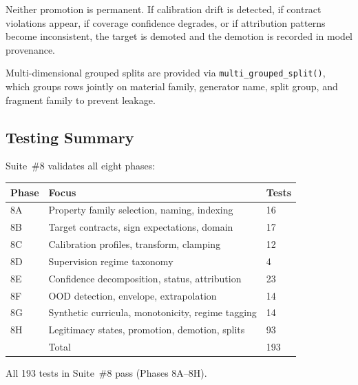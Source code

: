 \documentclass[11pt]{article}
\newcommand{\op}[1]{\texttt{#1}}
\begin{document}
Neither promotion is permanent.  If calibration drift is detected, if
contract violations appear, if coverage confidence degrades, or if
attribution patterns become inconsistent, the target is demoted and the
demotion is recorded in model provenance.

Multi-dimensional grouped splits are provided via
\op{multi\_grouped\_split()}, which groups rows jointly on material family,
generator name, split group, and fragment family to prevent leakage.

\subsection{Testing Summary}

Suite~\#8 validates all eight phases:

\begin{center}
\begin{tabular}{lll}
\textbf{Phase} & \textbf{Focus} & \textbf{Tests} \\
\hline
8A & Property family selection, naming, indexing & 16 \\
8B & Target contracts, sign expectations, domain & 17 \\
8C & Calibration profiles, transform, clamping & 12 \\
8D & Supervision regime taxonomy & 4 \\
8E & Confidence decomposition, status, attribution & 23 \\
8F & OOD detection, envelope, extrapolation & 14 \\
8G & Synthetic curricula, monotonicity, regime tagging & 14 \\
8H & Legitimacy states, promotion, demotion, splits & 93 \\
\hline
   & Total & 193 \\
\end{tabular}
\end{center}

All 193 tests in Suite~\#8 pass (Phases 8A--8H).
\end{document}
